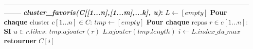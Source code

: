 \documentclass[11pt]{article}
\begin{document}
\begin{algorithm}
\begin{algorithmic}[1]
        \\
--------------------------------------------------------------------------------------------------------------------
        \State \textbf{\textit{cluster\_favoris(C[[1...n],[1...m],...k], u)}:}
        \State \hspace{0.5cm} $L \leftarrow [empty]$
        \State \hspace{0.5cm} \textbf{Pour chaque} cluster $c[1...n] \in C$:
        \State \hspace{1cm} $tmp \leftarrow [empty]$
        \State \hspace{1cm} \textbf{Pour chaque} repas $r \in c[1...n]$: 
        \State \hspace{2cm} \textbf{SI} $u \in r.likes$:
        \State \hspace{2.5cm} $tmp.ajouter(r)$
        \State \hspace{1cm} $L.ajouter(tmp.length)$
        \State \hspace{0.5cm} $i \leftarrow L.index\_du\_max$
        \State \hspace{0.5cm} \textbf{retourner} $C[i]$
    \end{algorithmic}
\end{algorithm}
\end{document}
